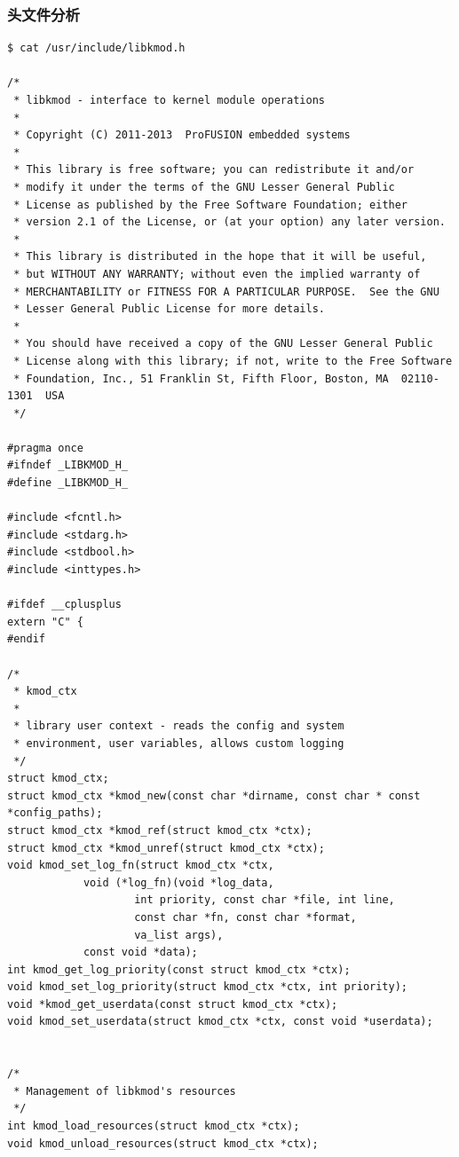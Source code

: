 \documentclass[11pt,a4paper]{article}
\begin{document}
\subsubsection{头文件分析}

{\begin{shaded}\begin{verbatim}
$ cat /usr/include/libkmod.h 

/*
 * libkmod - interface to kernel module operations
 *
 * Copyright (C) 2011-2013  ProFUSION embedded systems
 *
 * This library is free software; you can redistribute it and/or
 * modify it under the terms of the GNU Lesser General Public
 * License as published by the Free Software Foundation; either
 * version 2.1 of the License, or (at your option) any later version.
 *
 * This library is distributed in the hope that it will be useful,
 * but WITHOUT ANY WARRANTY; without even the implied warranty of
 * MERCHANTABILITY or FITNESS FOR A PARTICULAR PURPOSE.  See the GNU
 * Lesser General Public License for more details.
 *
 * You should have received a copy of the GNU Lesser General Public
 * License along with this library; if not, write to the Free Software
 * Foundation, Inc., 51 Franklin St, Fifth Floor, Boston, MA  02110-1301  USA
 */

#pragma once
#ifndef _LIBKMOD_H_
#define _LIBKMOD_H_

#include <fcntl.h>
#include <stdarg.h>
#include <stdbool.h>
#include <inttypes.h>

#ifdef __cplusplus
extern "C" {
#endif

/*
 * kmod_ctx
 *
 * library user context - reads the config and system
 * environment, user variables, allows custom logging
 */
struct kmod_ctx;
struct kmod_ctx *kmod_new(const char *dirname, const char * const *config_paths);
struct kmod_ctx *kmod_ref(struct kmod_ctx *ctx);
struct kmod_ctx *kmod_unref(struct kmod_ctx *ctx);
void kmod_set_log_fn(struct kmod_ctx *ctx,
            void (*log_fn)(void *log_data,
                    int priority, const char *file, int line,
                    const char *fn, const char *format,
                    va_list args),
            const void *data);
int kmod_get_log_priority(const struct kmod_ctx *ctx);
void kmod_set_log_priority(struct kmod_ctx *ctx, int priority);
void *kmod_get_userdata(const struct kmod_ctx *ctx);
void kmod_set_userdata(struct kmod_ctx *ctx, const void *userdata);


/*
 * Management of libkmod's resources
 */
int kmod_load_resources(struct kmod_ctx *ctx);
void kmod_unload_resources(struct kmod_ctx *ctx);


\end{verbatim}
\end{shaded}}
\end{document}
